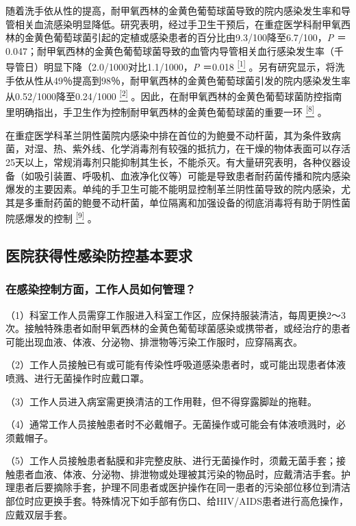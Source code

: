 随着洗手依从性的提高，耐甲氧西林的金黄色葡萄球菌导致的院内感染发生率和导管相关血流感染明显降低。研究表明，经过手卫生干预后，在重症医学科耐甲氧西林的金黄色葡萄球菌引起的定植或感染患者的百分比由9.3/100降至6.7/100，\emph{P}
＝0.047；耐甲氧西林的金黄色葡萄球菌导致的血管内导管相关血行感染发生率（千导管日）明显下降（2.0/1000对比1.1/1000，\emph{P}
＝0.018
\protect\hyperlink{text00031.htmlux5cux23ch1-30}{\textsuperscript{{[}1{]}}}
。另有研究显示，将洗手依从性从49％提高到98％，耐甲氧西林的金黄色葡萄球菌引发的院内感染发生率从0.52/1000降至0.24/1000
\protect\hyperlink{text00031.htmlux5cux23ch2-30}{\textsuperscript{{[}2{]}}}
。因此，在耐甲氧西林的金黄色葡萄球菌防控指南里明确指出，手卫生作为控制耐甲氧西林的金黄色葡萄球菌的重要一环
\protect\hyperlink{text00031.htmlux5cux23ch8-30}{\textsuperscript{{[}8{]}}}
。

在重症医学科革兰阴性菌院内感染中排在首位的为鲍曼不动杆菌，其为条件致病菌，对湿、热、紫外线、化学消毒剂有较强的抵抗力，在干燥的物体表面可以存活25天以上，常规消毒剂只能抑制其生长，不能杀灭。有大量研究表明，各种仪器设备（如吸引装置、呼吸机、血液净化仪等）可能是导致患者耐药菌传播和院内感染爆发的主要因素。单纯的手卫生可能不能明显控制革兰阴性菌导致的院内感染，尤其是多重耐药菌的鲍曼不动杆菌，单位隔离和加强设备的彻底消毒将有助于阴性菌院感爆发的控制
\protect\hyperlink{text00031.htmlux5cux23ch9-30}{\textsuperscript{{[}9{]}}}
。

\subsection{医院获得性感染防控基本要求}

\subsubsection{在感染控制方面，工作人员如何管理？}

（1）科室工作人员需穿工作服进入科室工作区，应保持服装清洁，每周更换2～3次。接触特殊患者如耐甲氧西林的金黄色葡萄球菌感染或携带者，或经治疗的患者可能出现血液、体液、分泌物、排泄物等污染工作服时，应穿隔离衣。

（2）工作人员接触已有或可能有传染性呼吸道感染患者时，或可能出现患者体液喷溅、进行无菌操作时应戴口罩。

（3）工作人员进入病室需更换清洁的工作用鞋，但不得穿露脚趾的拖鞋。

（4）通常工作人员接触患者时不必戴帽子。无菌操作或可能会有体液喷溅时，必须戴帽子。

（5）工作人员接触患者黏膜和非完整皮肤、进行无菌操作时，须戴无菌手套；接触患者血液、体液、分泌物、排泄物或处理被其污染的物品时，应戴清洁手套。护理患者后要摘除手套，护理不同患者或医护操作在同一患者的污染部位移位到清洁部位时应更换手套。特殊情况下如手部有伤口、给HIV/AIDS患者进行高危操作，应戴双层手套。


